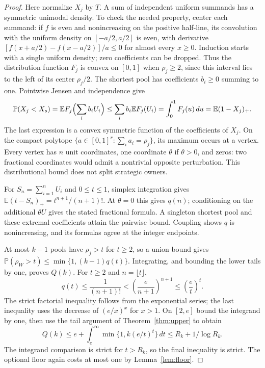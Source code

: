 \documentclass[11pt]{article}
\theoremstyle{definition}\newtheorem{definition}[theorem]{Definition}
\theoremstyle{remark}\newtheorem{remark}[theorem]{Remark}
\newcommand{\E}{\mathbb E}
\newcommand{\Prob}{\mathbb P}
\begin{document}
\begin{proof}
Here normalize $X_j$ by $T$. A sum of independent uniform summands has
a symmetric unimodal density. To check the needed property, center each
summand: if $f$ is even and nonincreasing on the positive half-line, its
convolution with the uniform density on $[-a/2,a/2]$ is even, with derivative
$[f(x+a/2)-f(x-a/2)]/a\le0$ for almost every $x\ge0$.
Induction starts with a single uniform density; zero coefficients can be
dropped. Thus the distribution function $F_j$ is convex on $[0,1]$ when
$\rho_j\ge2$, since this interval lies to the left of its center
$\rho_j/2$. The shortest pool has coefficients $b_i\ge0$ summing to one.
Pointwise Jensen and independence give
\[
 \Prob(X_j<X_s)=\E F_j\Bigl(\sum_i b_iU_i\Bigr)
 \le\sum_i b_i\E F_j(U_i)
 =\int_0^1F_j(u)\,du=\E(1-X_j)_+.
\]
The last expression is a convex symmetric function of the coefficients of
$X_j$. On the compact polytope $\{a\in[0,1]^r:\sum_i a_i=\rho_j\}$,
its maximum occurs at a vertex. Every vertex has $n$ unit coordinates,
one coordinate $\theta$ if $\theta>0$, and zeros: two fractional coordinates
would admit a nontrivial opposite perturbation. This distributional bound
does not split strategic owners.

For $S_n=\sum_{i=1}^nU_i$ and $0\le t\le1$, simplex integration gives
$\E(t-S_n)_+=t^{n+1}/(n+1)!$. At $\theta=0$ this gives $q(n)$;
conditioning on the additional $\theta U$ gives the stated fractional formula.
A singleton shortest pool and these extremal coefficients attain the
pairwise bound. Coupling shows $q$ is nonincreasing, and its formulas agree
at the integer endpoints.

At most $k-1$ pools have $\rho_j>t$ for $t\ge2$, so a union bound gives
$\Prob(\rho_W>t)\le\min\{1,(k-1)q(t)\}$. Integrating, and bounding
the lower tails by one, proves $Q(k)$. For $t\ge2$ and $n=\lfloor t\rfloor$,
\[
 q(t)\le\frac1{(n+1)!}
 <\left(\frac e{n+1}\right)^{n+1}
 \le\left(\frac et\right)^t.
\]
The strict factorial inequality follows from the exponential series; the
last inequality uses the decrease of $(e/x)^x$ for $x>1$.
On $[2,e]$ bound the integrand by one, then use the tail argument of
Theorem~\ref{thm:upper} to obtain
\[
 Q(k)\le e+\int_e^\infty\min\{1,k(e/t)^t\}\,dt
 \le R_k+1/\log R_k.
\]
The integrand comparison is strict for $t>R_k$, so the final inequality is
strict. The optional floor again costs at most one by Lemma~\ref{lem:floor}.
\end{proof}
\end{document}
